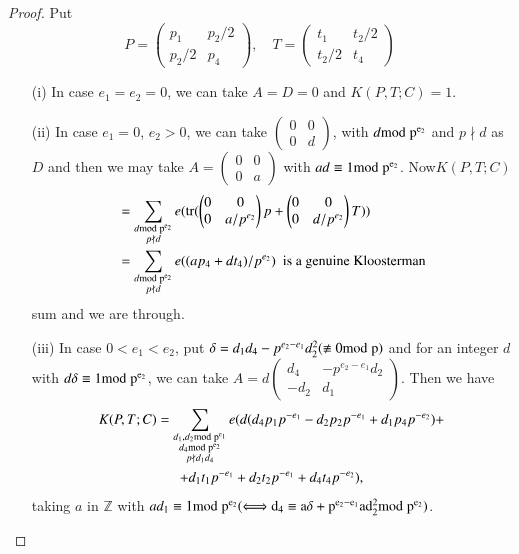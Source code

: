 \begin{proof}
Put
$$
P=
\begin{pmatrix}
p_{1} & p_{2}/2\\
p_{2}/2 & p_{4}
\end{pmatrix},\quad 
T=
\begin{pmatrix}
t_{1} & t_{2}/2\\
t_{2}/2 & t_{4}
\end{pmatrix}
$$
\begin{itemize}
\item[(i)] In case $e_{1}=e_{2}=0$, we can take $A=D=0$ and
  $K(P,T;C)=1$.

\item[(ii)] In case $e_{1}=0$, $e_{2}>0$, we can take
  $\left(\begin{smallmatrix} 0 & 0\\ 0 & d
\end{smallmatrix}\right)$, with $d\rm{mod} \; p^{e_{2}}$ and $p\nmid d$ as
  $D$ and then we may take $A=\left(\begin{smallmatrix} 0 & 0\\ 0 & a
\end{smallmatrix}\right)$ with $ad\equiv 1\rm{mod} \; p^{e_{2}}$. 
Now\pageoriginale $K(P,T;C)$
\begin{align*}
&= \sum\limits_{\substack{d\rm{mod} \; p^{e_{2}}\\ p\nmid d}}e(\operatorname{tr}(
\begin{pmatrix}
0 & 0\\
0 & a/p^{e_{2}}
\end{pmatrix}
p+
\begin{pmatrix}
0 & 0\\
0 & d/p^{e_{2}}
\end{pmatrix}
T))\\
&= \sum_{\substack{d\rm{mod} \; p^{e_{2}}\\ p\nmid
    d}}e((ap_{4}+dt_{4})/p^{e_{2}})\text{ \ is a genuine Kloosterman}
\end{align*}
sum and we are through.

\item[(iii)] In case $0<e_{1}<e_{2}$, put
  $\delta=d_{1}d_{4}-p^{e_{2}-e_{1}}d^{2}_{2}(\not\equiv 0\rm{mod} \; p)$ and
  for an integer $d$ with $d\delta\equiv 1\rm{mod} \; p^{e_{2}}$, we can take
  $A=d\left(\begin{smallmatrix} d_{4} & -p^{e_{2}-e_{1}}d_{2}\\ -d_{2}
      & d_{1}  \end{smallmatrix}\right)$. Then we have 
\begin{gather*}
K(P,T;C) =\sum_{\substack{d_{1},d_{2}\rm{mod} \; p^{e_{1}}\\ d_{4}\rm{mod} \;
    p^{e_{2}}\\ p\nmid
    d_{1}d_{4}}}e(d(d_{4}p_{1}
p^{-e_{1}}-d_{2}p_{2}p^{-e_{1}}+d_{1}p_{4}p^{-e_{2}})+\\ 
+d_{1}t_{1}p^{-e_{1}}+d_{2}t_{2}p^{-e_{1}}+d_{4}t_{4}p^{-e_{2}}), 
\end{gather*}
taking $a$ in $\mathbb{Z}$ with $ad_{1}\equiv 1\rm{mod} \;
p^{e_{2}}(\Longleftrightarrow d_{4}\equiv a\delta
+p^{e_{2}-e_{1}}ad^{2}_{2}\break\rm{mod} \; p^{e_{2}})$.


\end{itemize}
\end{proof}
